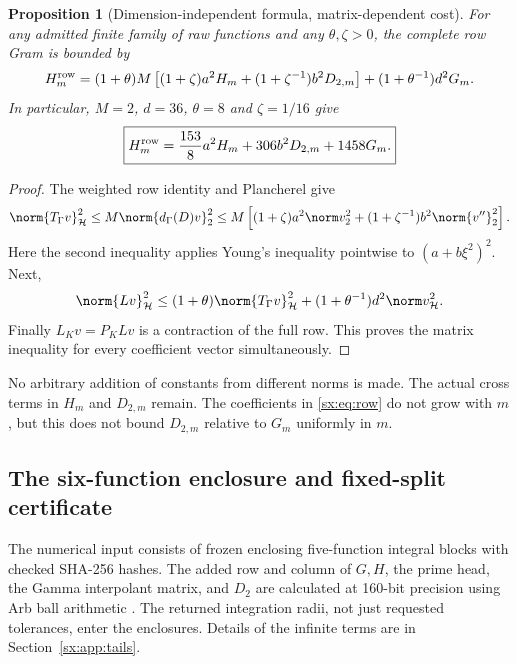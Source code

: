 \documentclass[11pt,a4paper]{article}
\numberwithin{equation}{section}
\newtheorem{proposition}[theorem]{Proposition}
\theoremstyle{definition}\newtheorem{definition}[theorem]{Definition}
\theoremstyle{remark}\newtheorem{remark}[theorem]{Remark}
\newcommand{\Hh}{\mathcal H}\newcommand{\Hw}{\mathcal H}
\begin{document}
\begin{proposition}[Dimension-independent formula, matrix-dependent cost]
For any admitted finite family of raw functions and any $\theta,\zeta>0$,
the complete row Gram is bounded by
\begin{equation}\label{sx:eq:general-row}
 H_m^{\rm row}=(1+\theta)M\left[(1+\zeta)a^2H_m
                  +(1+\zeta^{-1})b^2D_{2,m}\right]
                +(1+\theta^{-1})d^2G_m.
\end{equation}
In particular, $M=2$, $d=36$, $\theta=8$ and $\zeta=1/16$ give
\begin{equation}\label{sx:eq:row}
 \boxed{H_m^{\rm row}=\frac{153}{8}a^2H_m+306b^2D_{2,m}+1458G_m.}
\end{equation}
\end{proposition}
\begin{proof}
The weighted row identity and Plancherel give
\[
 \norm{T_\Gamma v}_\Hh^2
 \le M\norm{d_\Gamma(D)v}_2^2
 \le M\left[(1+\zeta)a^2\norm v_2^2
                +(1+\zeta^{-1})b^2\norm{v''}_2^2\right].
\]
Here the second inequality applies Young's inequality pointwise to
$(a+b\xi^2)^2$. Next,
\[
 \norm{Lv}_\Hh^2\le(1+\theta)\norm{T_\Gamma v}_\Hh^2
                   +(1+\theta^{-1})d^2\norm v_\Hh^2.
\]
Finally $L_Kv=P_KLv$ is a contraction of the full row. This proves the
matrix inequality for every coefficient vector simultaneously.
\end{proof}
No arbitrary addition of constants from different norms is made.
The actual cross terms in $H_m$ and $D_{2,m}$ remain. The coefficients
in \eqref{sx:eq:row} do not grow with $m$, but this does not bound
$D_{2,m}$ relative to $G_m$ uniformly in $m$.

\subsection{The six-function enclosure and fixed-split certificate}
The numerical input consists of frozen enclosing five-function integral
blocks with checked SHA-256 hashes. The added row and column of $G,H$,
the prime head, the Gamma interpolant matrix, and $D_2$ are calculated
at 160-bit precision using Arb ball arithmetic \cite{fzArbIntegration}.
The returned integration radii, not just requested tolerances, enter
the enclosures. Details of the infinite terms are in Section~\ref{sx:app:tails}.
\end{document}
